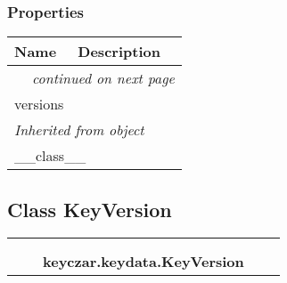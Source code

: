 
  \subsubsection{Properties}

    \vspace{-1cm}
\hspace{\varindent}\begin{longtable}{|p{\varnamewidth}|p{\vardescrwidth}|l}
\cline{1-2}
\cline{1-2} \centering \textbf{Name} & \centering \textbf{Description}& \\
\cline{1-2}
\endhead\cline{1-2}\multicolumn{3}{r}{\small\textit{continued on next page}}\\\endfoot\cline{1-2}
\endlastfoot\raggedright v\-e\-r\-s\-i\-o\-n\-s\- & &\\
\cline{1-2}
\multicolumn{2}{|l|}{\textit{Inherited from object}}\\
\multicolumn{2}{|p{\varwidth}|}{\raggedright \_\_class\_\_}\\
\cline{1-2}
\end{longtable}



\subsection{Class KeyVersion}

    \label{keyczar:keydata:KeyVersion}
\begin{tabular}{cccccc}
\multicolumn{2}{r}{\settowidth{\BCL}{object}\multirow{2}{\BCL}{object}}
&&
  \\\cline{3-3}
  &&\multicolumn{1}{c|}{}
&&
  \\
&&\multicolumn{2}{l}{\textbf{keyczar.keydata.KeyVersion}}
\end{tabular}


